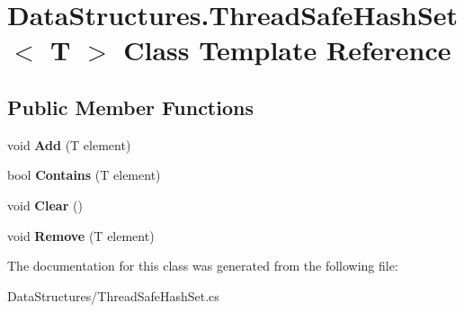 \hypertarget{class_data_structures_1_1_thread_safe_hash_set}{}\section{Data\+Structures.\+Thread\+Safe\+Hash\+Set$<$ T $>$ Class Template Reference}
\label{class_data_structures_1_1_thread_safe_hash_set}
\subsection*{Public Member Functions}
\begin{DoxyCompactItemize}
\item 
\mbox{\label{class_data_structures_1_1_thread_safe_hash_set_a94dea60b9b381fd3c1ec832101fde30e}} 
void {\bfseries Add} (T element)
\item 
\mbox{\label{class_data_structures_1_1_thread_safe_hash_set_ae1b471930fe170dd74c91ea00f6768c0}} 
bool {\bfseries Contains} (T element)
\item 
\mbox{\label{class_data_structures_1_1_thread_safe_hash_set_a746ae0938ea3ba645fae665db71ec5e9}} 
void {\bfseries Clear} ()
\item 
\mbox{\label{class_data_structures_1_1_thread_safe_hash_set_a283fab4177808d5d12d2963eb1fe2cf5}} 
void {\bfseries Remove} (T element)
\end{DoxyCompactItemize}


The documentation for this class was generated from the following file\+:\begin{DoxyCompactItemize}
\item 
Data\+Structures/Thread\+Safe\+Hash\+Set.\+cs\end{DoxyCompactItemize}
